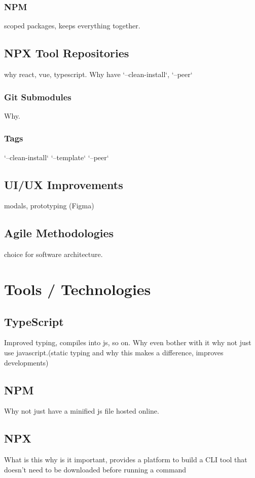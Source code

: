 \documentclass{l4proj}
\begin{document}
\subsection{NPM}
\text scoped packages, keeps everything together.
\section{NPX Tool Repositories}
\text why react, vue, typescript. Why have `--clean-install`, `--peer`
\subsection{Git Submodules}
\text Why.
\subsection{Tags}
\text `--clean-install` `--template` `--peer`
\section{UI/UX Improvements}
\text modals, prototyping (Figma)
\section{Agile Methodologies}
\text choice for software architecture.
\chapter{Tools / Technologies}

\section{TypeScript}
\text Improved typing, compiles into js, so on. Why even bother with it why not just use javascript.(static typing and why this makes a difference, improves developments)
\section{NPM}
\text Why not just have a minified js file hosted online.
\section{NPX}
\text What is this why is it important, provides a platform to build a CLI tool that doesn’t need to be downloaded before running a command
\end{document}
